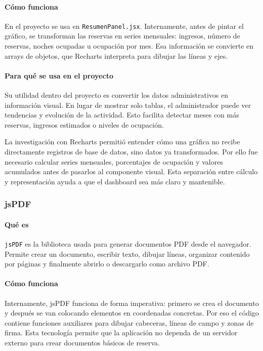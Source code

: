 \documentclass[11pt,a4paper]{article}
\begin{document}
\paragraph{Cómo funciona}
En el proyecto se usa en \texttt{ResumenPanel.jsx}. Internamente, antes de pintar el gráfico, se transforman las reservas en series mensuales: ingresos, número de reservas, noches ocupadas u ocupación por mes. Esa información se convierte en arrays de objetos, que Recharts interpreta para dibujar las líneas y ejes.

\paragraph{Para qué se usa en el proyecto}
Su utilidad dentro del proyecto es convertir los datos administrativos en información visual. En lugar de mostrar solo tablas, el administrador puede ver tendencias y evolución de la actividad. Esto facilita detectar meses con más reservas, ingresos estimados o niveles de ocupación.

La investigación con Recharts permitió entender cómo una gráfica no recibe directamente registros de base de datos, sino datos ya transformados. Por ello fue necesario calcular series mensuales, porcentajes de ocupación y valores acumulados antes de pasarlos al componente visual. Esta separación entre cálculo y representación ayuda a que el dashboard sea más claro y mantenible.

\subsubsection{jsPDF}
\paragraph{Qué es}
\texttt{jsPDF} es la biblioteca usada para generar documentos PDF desde el navegador. Permite crear un documento, escribir texto, dibujar líneas, organizar contenido por páginas y finalmente abrirlo o descargarlo como archivo PDF.

\paragraph{Cómo funciona}
Internamente, jsPDF funciona de forma imperativa: primero se crea el documento y después se van colocando elementos en coordenadas concretas. Por eso el código contiene funciones auxiliares para dibujar cabeceras, líneas de campo y zonas de firma. Esta tecnología permite que la aplicación no dependa de un servidor externo para crear documentos básicos de reserva.
\end{document}
